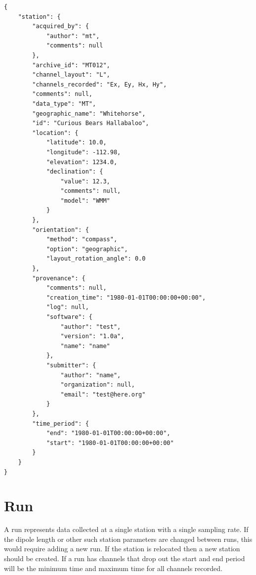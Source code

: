 \documentclass{article}
\begin{document}
\begin{verbatim}
{
    "station": {
        "acquired_by": {
            "author": "mt",
            "comments": null
        },
        "archive_id": "MT012",
        "channel_layout": "L",
        "channels_recorded": "Ex, Ey, Hx, Hy",
        "comments": null,
        "data_type": "MT",
        "geographic_name": "Whitehorse",
        "id": "Curious Bears Hallabaloo",
        "location": {
            "latitude": 10.0,
            "longitude": -112.98,
            "elevation": 1234.0,
            "declination": {
                "value": 12.3,
                "comments": null,
                "model": "WMM"
            }
        },
        "orientation": {
            "method": "compass",
            "option": "geographic",
            "layout_rotation_angle": 0.0
        },
        "provenance": {
            "comments": null,
            "creation_time": "1980-01-01T00:00:00+00:00",
            "log": null,
            "software": {
                "author": "test",
                "version": "1.0a",
                "name": "name"
            },
            "submitter": {
                "author": "name",
                "organization": null,
                "email": "test@here.org"
            }
        },
        "time_period": {
            "end": "1980-01-01T00:00:00+00:00",
            "start": "1980-01-01T00:00:00+00:00"
        }
    }
}
\end{verbatim}

\newpage
\section{Run}

A run represents data collected at a single station with a single sampling rate. If the dipole length or other such station parameters are changed between runs, this would require adding a new run.  If the station is relocated then a new station should be created.  If a run has channels that drop out the start and end period will be the minimum time and maximum time for all channels recorded.
\end{document}

